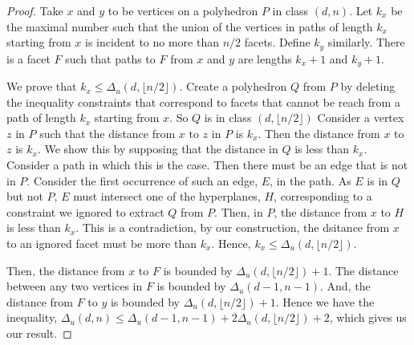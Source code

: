 \documentclass[11pt,a4paper]{article}
\theoremstyle{definition}
\begin{document}
\begin{proof}
Take $x$ and $y$ to be vertices on a polyhedron $P$ in class $(d,n)$. Let $k_x$ be the maximal number such that the union of the vertices in paths of length $k_x$ starting from $x$ is incident to no more than $n/2$ facets. Define $k_y$ similarly. There is a facet $F$ such that paths to $F$ from $x$ and $y$ are lengths $k_x+1$ and $k_y+1$.

We prove that $k_x\le\Delta_u(d,\lfloor n/2\rfloor)$. Create a polyhedron $Q$ from $P$ by deleting the inequality constraints that correspond to facets that cannot be reach from a path of length $k_x$ starting from $x$. So $Q$ is in class $(d,\lfloor n/2\rfloor)$ Consider a vertex $z$ in $P$ such that the distance from $x$ to $z$ in $P$ is $k_x$. Then the distance from $x$ to $z$ is $k_x$. We show this by supposing that the distance in $Q$ is less than $k_x$. Consider a path in which this is the case. Then there must be an edge that is not in $P$. Consider the first occurrence of such an edge, $E$, in the path. As $E$ is in $Q$ but not $P$, $E$ must intersect one of the hyperplanes, $H$, corresponding to a constraint we ignored to extract $Q$ from $P$. Then, in $P$, the distance from $x$ to $H$ is less than $k_x$. This is a contradiction, by our construction, the dsitance from $x$ to an ignored facet must be more than $k_x$. Hence, $k_x\le\Delta_u(d,\lfloor n/2\rfloor)$.

Then, the distance from $x$ to $F$ is bounded by $\Delta_u(d,\lfloor n/2\rfloor)+1$. The distance between any two vertices in $F$ is bounded by $\Delta_u(d-1,n-1)$. And, the distance from $F$ to $y$ is 
bounded by $\Delta_u(d,\lfloor n/2\rfloor)+1$. Hence we have the inequality, $\Delta_u(d,n)\le\Delta_u(d-1,n-1)+2\Delta_u(d,\lfloor n/2\rfloor)+2$, which gives us our result.
\end{proof}
\end{document}
